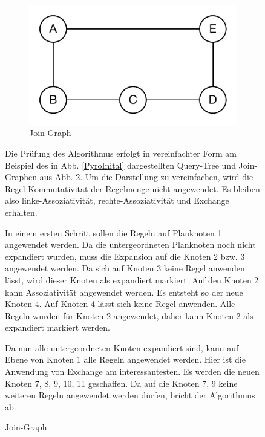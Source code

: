 \begin{figure}[h]
\begin{figure}[ht]
  \centering
  \includegraphics[scale=0.75]{05_ResultsEvaluation/00_media/PyroJoinGraph.pdf}
  \caption{Join-Graph}
  \label{PyroJoinGraph}
\end{figure}

Die Prüfung des Algorithmus erfolgt in vereinfachter Form am Beispiel des in Abb. \ref{PyroInital} dargestellten Query-Tree und Join-Graphen aus Abb. \ref{PyroJoinGraph}. Um die Darstellung zu vereinfachen, wird die Regel Kommutativität der Regelmenge nicht angewendet. Es bleiben also linke-Assoziativität, rechte-Assoziativität und Exchange erhalten.

In einem ersten Schritt sollen die Regeln auf Planknoten 1 angewendet werden. Da die untergeordneten Planknoten noch nicht expandiert wurden, muss die Expansion auf die Knoten 2 bzw. 3 angewendet werden. Da sich auf Knoten 3 keine Regel anwenden lässt, wird dieser Knoten als expandiert markiert. Auf den Knoten 2 kann Assoziativität angewendet werden. Es entsteht so der neue Knoten 4. Auf Knoten 4 lässt sich keine Regel anwenden. Alle Regeln wurden für Knoten 2 angewendet, daher kann Knoten 2 als expandiert markiert werden.

Da nun alle untergeordneten Knoten expandiert sind, kann auf Ebene von Knoten 1 alle Regeln angewendet werden. Hier ist die Anwendung von Exchange am interessantesten. Es werden die neuen Knoten 7, 8, 9, 10, 11 geschaffen. Da auf die Knoten 7, 9 keine weiteren Regeln angewendet werden dürfen, bricht der Algorithmus ab. 


\end{figure}
